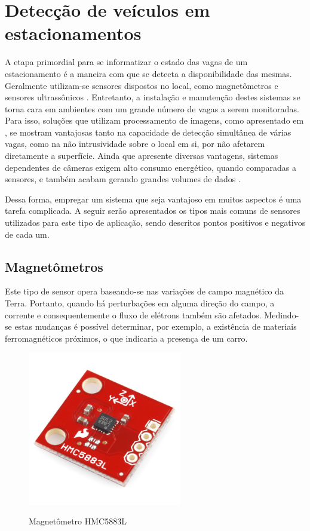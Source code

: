 \documentclass[oneside,openright,12pt]{ufsm_2015} %
\begin{document}
\section{Detecção de veículos em estacionamentos}
A etapa primordial para se informatizar o estado das vagas de um estacionamento é a maneira com que se detecta a disponibilidade das mesmas. Geralmente utilizam-se sensores dispostos no local, como magnetômetros \cite{barton2007d} e sensores ultrassônicos \cite{lee2008intelligent}. Entretanto, a instalação e manutenção destes sistemas se torna cara em ambientes com um grande número de vagas a serem monitoradas. Para isso, soluções que utilizam processamento de imagens, como apresentado em \cite{ichihashi2009vacant}, se mostram vantajosas tanto na capacidade de detecção simultânea de várias vagas, como na não intrusividade sobre o local em si, por não afetarem diretamente a superfície. Ainda que apresente diversas vantagens, sistemas dependentes de câmeras exigem alto consumo energético, quando comparadas a sensores, e também acabam gerando grandes volumes de dados \cite{wu2007robust}.

Dessa forma, empregar um sistema que seja vantajoso em muitos aspectos é uma tarefa complicada. A seguir serão apresentados os tipos mais comuns de sensores utilizados para este tipo de aplicação, sendo descritos pontos positivos e negativos de cada um.

\subsection{Magnetômetros} 
Este tipo de sensor opera baseando-se nas variações de campo magnético da Terra. Portanto, quando há perturbações em alguma direção do campo, a corrente e consequentemente o fluxo de elétrons também são afetados. Medindo-se estas mudanças é possível determinar, por exemplo, a existência de materiais ferromagnéticos próximos, o que indicaria a presença de um carro. 

\begin{figure}[ht]
    \caption{\label{exepretex} Magnetômetro HMC5883L}
    \centering
    \includegraphics[width=0.6\textwidth]{figuras/5883L_BoB.jpg}
    \vspace{\baselineskip} %
        \label{fig:magnetometro}
\end{figure}
\end{document}
